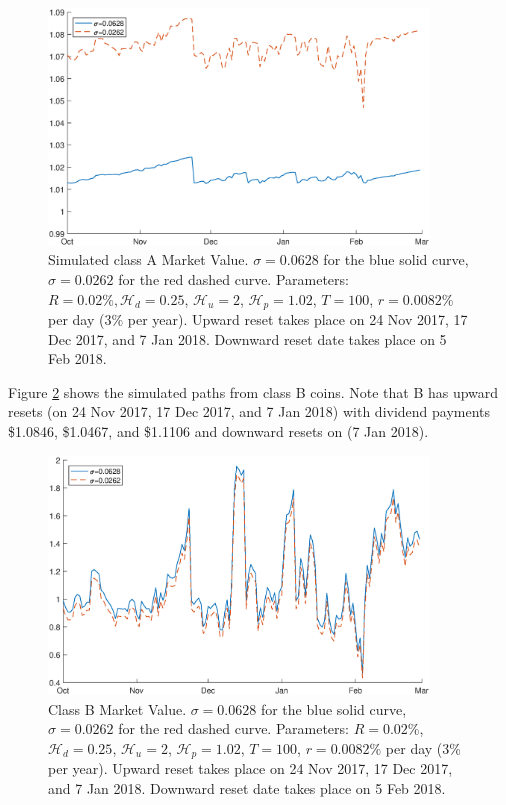 \documentclass[draft, noinfoline]{ectaart}
\numberwithin{equation}{section}
\theoremstyle{plain}
\begin{document}
\begin{figure}[!htb]
\begin{centering}
\includegraphics[width=0.9\textwidth]{WA.eps}
\par\end{centering}
\caption{Simulated class A Market Value. $\sigma = 0.0628$ for the blue solid curve, $\sigma=0.0262$ for the red dashed curve. Parameters: $R=0.02\%,\mathcal{H}_{d}=0.25$, $\mathcal{H}_{u} =2$, $\mathcal{H}_{p}=1.02$, $T=100$, $r=0.0082\%$ per day ($3\%$ per year). Upward reset takes place on 24 Nov 2017, 17 Dec 2017, and 7 Jan 2018. Downward reset date takes place on 5 Feb 2018.}\label{fig:valA}
\end{figure}

Figure \ref{fig:valB} shows the simulated paths from class B coins. Note that B has upward resets (on 24 Nov 2017, 17 Dec 2017, and 7 Jan 2018) with dividend payments \$1.0846, \$1.0467, and \$1.1106 and downward resets on (7 Jan 2018).


\begin{figure}[!htb]
\begin{centering}
\includegraphics[width=0.9\textwidth]{WB}
\par\end{centering}
\caption{Class B Market Value. $\sigma = 0.0628$ for the blue solid curve, $\sigma=0.0262$ for the red dashed curve. Parameters: $R=0.02\%$, $\mathcal{H}_{d}=0.25$, $\mathcal{H}_{u} =2$, $\mathcal{H}_{p}=1.02$, $T=100$, $r=0.0082\%$ per day (3\% per year). Upward reset takes place on 24 Nov 2017, 17 Dec 2017, and 7 Jan 2018. Downward reset date takes place on 5 Feb 2018.}
\label{fig:valB}
\end{figure}
\end{document}

